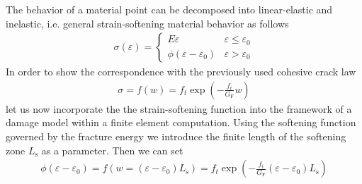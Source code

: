 \documentclass[main.tex]{subfiles}
\begin{document}
The behavior of a material point can be decomposed into linear-elastic and inelastic, i.e. general strain-softening material behavior as follows
\begin{align}
\sigma(\varepsilon) = \left\{ 
\begin{array}{ll}
E \varepsilon  &   \varepsilon \le \varepsilon_0 \\
\phi(\varepsilon - \varepsilon_0) 
 &  \varepsilon > \varepsilon_0
\end{array}
\right.
\end{align}
In order to show the correspondence with the previously used cohesive crack law 
\begin{align}
\label{EQ:softening_exp}
\sigma = f(w) = f_t \exp\left( - \frac{f_t}{G_\mathrm{F}}w \right)
\end{align}
let us now incorporate the the strain-softening function  into the framework of a damage model within a finite element computation. Using the softening function governed by the fracture energy we introduce the finite length of the softening zone $L_\mathrm{s}$ as a parameter. Then we can set 
\begin{align}
\label{EQ:strain_based_softening_exp}
\phi(\varepsilon - \varepsilon_0) = f( w=(\varepsilon-\varepsilon_0) L_\mathrm{s})
=
f_t \exp\left( - \frac{f_t}{G_\mathrm{F}} (\varepsilon-\varepsilon_0) L_\mathrm{s} \right)
\end{align}
\end{document}
